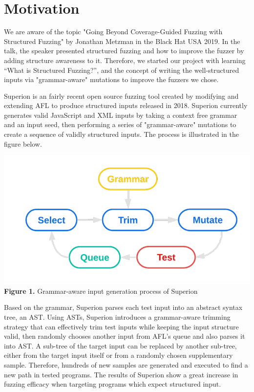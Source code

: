 \documentclass[12pt]{diazessay}
\begin{document}
\section*{Motivation}

We are aware of the topic "Going Beyond Coverage-Guided Fuzzing with Structured Fuzzing" by Jonathan Metzman in the Black Hat USA 2019\cite{blackhat2019}.
In the talk, the speaker presented structured fuzzing and how to improve the fuzzer by adding structure awareness to it. 
Therefore, we started our project with learning “What is Structured Fuzzing?”, and the concept of writing the well-structured inputs via "grammar-aware" mutations to improve the fuzzers we chose.

Superion\cite{superion} is an fairly recent open source fuzzing tool created by modifying and extending AFL to produce structured inputs released in 2018.
Superion currently generates valid JavaScript and XML inputs by taking a context free grammar and an input seed, then performing a series of "grammar-aware" mutations to create a sequence of validly structured inputs. The process is illustrated in the figure below.

\begin{center}
	\includegraphics[scale=0.4, trim={0 1cm 0 0}, clip]{superionfig.png}\\
	\textbf{Figure 1.} Grammar-aware input generation process of Superion
\end{center}
\vspace{3mm}

Based on the grammar, Superion parses each test input into an abstract syntax tree, an AST. Using ASTs, Superion introduces a grammar-aware trimming strategy that can effectively trim test inputs while keeping the input structure valid, then randomly chooses another input from AFL’s queue and also parses it into AST. A sub-tree of the target input can be replaced by another sub-tree, either from the target input itself or from a randomly chosen supplementary sample. Therefore, hundreds of new samples are generated and executed to find a new path in tested programs. The results of Superion show a great increase in fuzzing efficacy when targeting programs which expect structured input.
\end{document}
